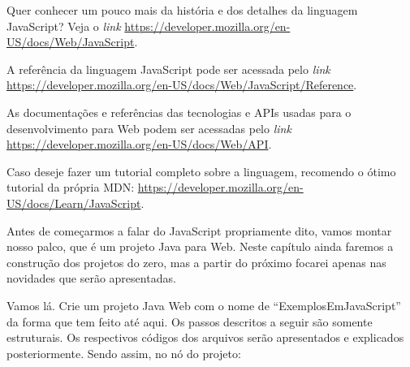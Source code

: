 \begin{saibaMais}
    Quer conhecer um pouco mais da história e dos detalhes da linguagem JavaScript? Veja o \textit{link} \url{https://developer.mozilla.org/en-US/docs/Web/JavaScript}.
\end{saibaMais}

\begin{saibaMais}
    A referência da linguagem JavaScript pode ser acessada pelo \textit{link} \url{https://developer.mozilla.org/en-US/docs/Web/JavaScript/Reference}.
\end{saibaMais}

\begin{saibaMais}
    As documentações e referências das tecnologias e APIs usadas para o desenvolvimento para Web podem ser acessadas pelo \textit{link} \url{https://developer.mozilla.org/en-US/docs/Web/API}.
\end{saibaMais}

\begin{saibaMais}
    Caso deseje fazer um tutorial completo sobre a linguagem, recomendo o ótimo tutorial da própria MDN: \url{https://developer.mozilla.org/en-US/docs/Learn/JavaScript}.
\end{saibaMais}

Antes de começarmos a falar do JavaScript propriamente dito, vamos montar nosso palco, que é um projeto Java para Web. Neste capítulo ainda faremos a construção dos projetos do zero, mas a partir do próximo focarei apenas nas novidades que serão apresentadas.

Vamos lá. Crie um projeto Java Web com o nome de ``ExemplosEmJavaScript'' da forma que tem feito até aqui. Os passos descritos a seguir são somente estruturais. Os respectivos códigos dos arquivos serão apresentados e explicados posteriormente. Sendo assim, no nó  do projeto:

